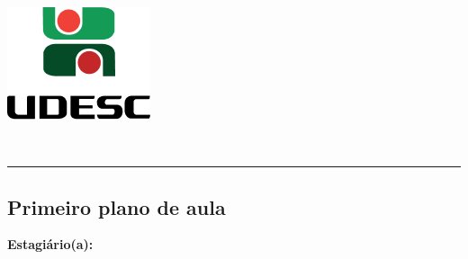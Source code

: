 %
\begin{center}
    \begin{minipage}[!]{\linewidth}
        \begin{minipage}[!]{.19\linewidth}
            \includegraphics[width=\linewidth]{img/logo.png}           
        \end{minipage}
        \begin{minipage}[!]{.8\linewidth}
            \center
            \ABNTEXchapterfont\normalsize\MakeUppercase{\imprimirinstituicao}
            \par
            \vspace*{10pt}                     
            \ABNTEXchapterfont\normalsize\MakeUppercase{\centro}
            \par
            \vspace*{10pt}           
            \ABNTEXchapterfont\normalsize\MakeUppercase{\disciplina}
        \end{minipage}        
    \end{minipage}
    \\ \vspace{0.5cm}
    \rule{\textwidth}{.5pt}   
\end{center}

\textual
    \begin{center}
        \section{Primeiro plano de aula}
        \par
    \end{center}        
        \noindent \textbf{Estagiário(a): }\imprimirautor 
        
